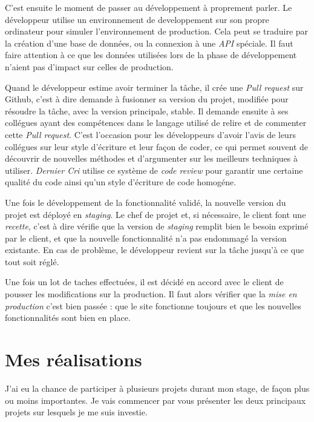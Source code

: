 C'est ensuite le moment de passer au développement à proprement parler.
Le développeur utilise un environnement de developpement sur son propre
ordinateur pour simuler l'environnement de production. Cela peut se
traduire par la création d'une base de données, ou la connexion à une
\emph{API} spéciale. Il faut faire attention à ce que les données
utilisées lors de la phase de développement n'aient pas d'impact sur
celles de production.

\bigskip

Quand le développeur estime avoir terminer la tâche, il crée une
\emph{Pull request} sur Github, c'est à dire demande à fusionner sa
version du projet, modifiée pour résoudre la tâche, avec la version
principale, stable. Il demande ensuite à ses collégues ayant des
compétences dans le langage utilisé de relire et de commenter cette
\emph{Pull request}. C'est l'occasion pour les développeurs d'avoir
l'avis de leurs collégues sur leur style d'écriture et leur façon de
coder, ce qui permet souvent de découvrir de nouvelles méthodes et
d'argumenter sur les meilleurs techniques à utiliser. \emph{Dernier Cri}
utilise ce système de \emph{code review} pour garantir une certaine
qualité du code ainsi qu'un style d'écriture de code homogéne.

\bigskip

Une fois le développement de la fonctionnalité validé, la nouvelle
version du projet est déployé en \emph{staging}. Le chef de projet et,
si nécessaire, le client font une \emph{recette}, c'est à dire vérifie
que la version de \emph{staging} remplit bien le besoin exprimé par le
client, et que la nouvelle fonctionnalité n'a pas endommagé la version
existante. En cas de problème, le développeur revient sur la tâche
jusqu'à ce que tout soit réglé.

\bigskip

Une fois un lot de taches effectuées, il est décidé en accord avec le
client de pousser les modifications sur la production. Il faut alors
vérifier que la \emph{mise en production} c'est bien passée : que le
site fonctionne toujours et que les nouvelles fonctionnalités sont bien
en place.

\newpage

\section{Mes réalisations}\label{mes-ruxe9alisations}

\bigskip

J'ai eu la chance de participer à plusieurs projets durant mon stage, de
façon plus ou moins importantes. Je vais commencer par vous présenter
les deux principaux projets sur lesquels je me suis investie.

